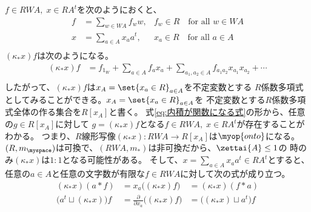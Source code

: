		$f\in RWA,\;x\in RA^t$を次のようにおくと、
		\begin{equation*}\begin{array}{rll} %
			f &= \sum_{w\in WA}f_ww, &f_w\in R \quad\text{for all }w\in WA \\
			x &= \sum_{a\in A}x_aa^t, &x_a\in R \quad\text{for all }a\in A \\
		\end{array}\end{equation*} %
		$(\kappa_*x)f$は次のようになる。
		\begin{equation}\label{eq:内積が関数になる式}\begin{split} %
			(\kappa_*x)f &= f_{1_W} + \sum_{a\in A}f_{a}x_a
				+ \sum_{a_1,a_2\in A}f_{a_1a_2}x_{a_1}x_{a_2} + \cdots \\
		\end{split}\end{equation} %
		したがって、$(\kappa_*x)f$は$x_A=\set{x_a\in R}_{a\in A}$を不定変数とする
		$R$係数多項式としてみることができる。$x_A=\set{x_a\in R}_{a\in A}$を
		不定変数とする$R$係数多項式全体の作る集合を$R[x_A]$と書く。
		式\eqref{eq:内積が関数になる式}の形から、任意の$g\in R[x_A]$に対して
		$g=(\kappa_*x)f$となる$f\in RWA,\;x\in RA^t$が存在することがわかる。
		つまり、$R$線形写像$(\kappa_*x):RWA\to R[x_A]$は$\myop{onto}$になる。
		$(R,m_\myspace)$は可換で、$(RWA,m_*)$は非可換だから、$\zettai{A}\le 1$の
		時のみ$(\kappa_*x)$は$1:1$となる可能性がある。
		そして、$x=\sum_{a\in A}x_aa^t\in RA^t$とすると、
		任意の$a\in A$と任意の文字数が有限な$f\in RWA$に対して次の式が成り立つ。
		\begin{equation}\label{eq:コヒーレント状態}\begin{array}{lll} %
			(\kappa_*x)(a*f) &= x_a\bigl((\kappa_*x)f\bigr) &= (\kappa_*x)(f*a) \\
			\bigr(a^t\sqcup(\kappa_*x)\bigr)f
				&= \frac{\partial}{\partial x_a}\bigl((\kappa_*x)f\bigr)
				&= \bigl((\kappa_*x)\sqcup a^t\bigr)f \\
		\end{array}\end{equation} %
